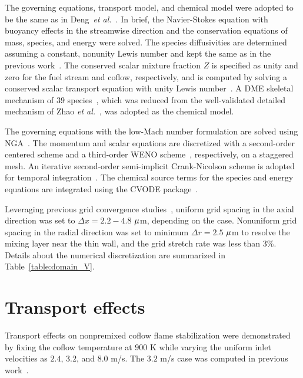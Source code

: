 \documentclass[review,3p,times]{elsarticle}
\begin{document}
The governing equations, transport model, and chemical model were adopted to be the same as in Deng~\emph{et al.}~\cite{deng15}.  In brief, the Navier-Stokes equation with buoyancy effects in the streamwise direction and the conservation equations of mass, species, and energy were solved.  The species diffusivities are determined assuming a constant, nonunity Lewis number \textcolor{Rv1}{and kept the same as in the previous work~\cite{deng15}}.  The conserved scalar mixture fraction $Z$ is specified as unity and zero for the fuel stream and coflow, respectively, and is computed by solving a conserved scalar transport equation with unity Lewis number~\cite{pitsch98b}.  A DME skeletal mechanism of $39$ species~\cite{bhagatwala15}, which was reduced from the well-validated detailed mechanism of Zhao \emph{et al.}~\cite{zhao08}, was adopted as the chemical model.

The governing equations with the low-Mach number formulation are solved using NGA~\cite{desjardins08}.  The momentum and scalar equations are discretized with a second-order centered scheme and a third-order WENO scheme~\cite{liu94}, respectively, on a staggered mesh.  An iterative second-order semi-implicit Crank-Nicolson scheme is adopted for temporal integration~\cite{pierce01}.  The chemical source terms for the species and energy equations are integrated using the CVODE package~\cite{cohen96}.

Leveraging previous grid convergence studies~\cite{deng15}, uniform grid spacing in the axial direction was set to $\Delta x = 2.2-4.8$ ${\rm \mu}$m, depending on the case.  Nonuniform grid spacing in the radial direction was set to minimum $\Delta r = 2.5$ ${\rm \mu}$m to resolve the mixing layer near the thin wall, and the grid stretch rate was less than $3$\%.  Details about the numerical discretization are summarized in Table~\ref{table:domain_V}.      


\section{Transport effects}

Transport effects on nonpremixed coflow flame stabilization were demonstrated by fixing the coflow temperature at $900$ K while varying the uniform inlet velocities as $2.4$, $3.2$, and $8.0$ m/s.  The $3.2$ m/s case was computed in previous work~\cite{deng15}.  
\end{document}
